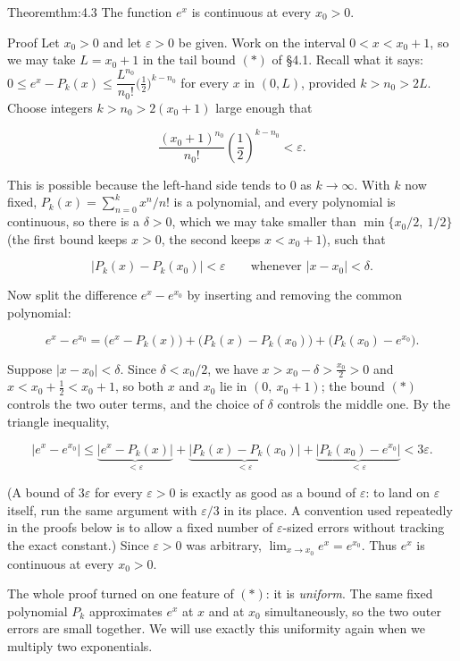\documentclass[a4paper,12pt,oneside]{memoir}
\begin{document}
\begin{envtheorem}{Theorem}{thm:4.3}{}
The function \(e^{x}\) is continuous at every \(x_{0} > 0\).
\end{envtheorem}
\begin{envproof}{Proof}{}{}
Let \(x_{0} > 0\) and let \(\varepsilon > 0\) be given. Work on the interval \(0 < x < x_{0} + 1\), so we may take \(L = x_{0} + 1\) in the tail bound \((*)\) of §4.1. Recall what it says: \(0 \le e^{x} - P_{k}(x) \le \dfrac{L^{n_{0}}}{n_{0}!}\bigl(\tfrac{1}{2}\bigr)^{k - n_{0}}\) for every \(x\) in \((0, L)\), provided \(k > n_{0} > 2L\). Choose integers \(k > n_{0} > 2(x_{0} + 1)\) large enough that

\[ \frac{(x_{0} + 1)^{n_{0}}}{n_{0}!} \left(\frac{1}{2}\right)^{k - n_{0}} < \varepsilon. \]

This is possible because the left-hand side tends to \(0\) as \(k \to \infty\). With \(k\) now fixed, \(P_{k}(x) = \sum_{n=0}^{k} x^{n}/n!\) is a polynomial, and every polynomial is continuous, so there is a \(\delta > 0\), which we may take smaller than \(\min\{x_{0}/2,\ 1/2\}\) (the first bound keeps \(x > 0\), the second keeps \(x < x_{0} + 1\)), such that

\[ \lvert P_{k}(x) - P_{k}(x_{0}) \rvert < \varepsilon \qquad \text{whenever } \lvert x - x_{0} \rvert < \delta. \]

Now split the difference \(e^{x} - e^{x_{0}}\) by inserting and removing the common polynomial:

\[ e^{x} - e^{x_{0}} = \bigl(e^{x} - P_{k}(x)\bigr) + \bigl(P_{k}(x) - P_{k}(x_{0})\bigr) + \bigl(P_{k}(x_{0}) - e^{x_{0}}\bigr). \]

Suppose \(\lvert x - x_{0} \rvert < \delta\). Since \(\delta < x_{0}/2\), we have \(x > x_{0} - \delta > \tfrac{x_{0}}{2} > 0\) and \(x < x_{0} + \tfrac{1}{2} < x_{0} + 1\), so both \(x\) and \(x_{0}\) lie in \((0,\ x_{0} + 1)\); the bound \((*)\) controls the two outer terms, and the choice of \(\delta\) controls the middle one. By the triangle inequality,

\[ \lvert e^{x} - e^{x_{0}} \rvert \le \underbrace{\lvert e^{x} - P_{k}(x) \rvert}_{< \varepsilon} + \underbrace{\lvert P_{k}(x) - P_{k}(x_{0}) \rvert}_{< \varepsilon} + \underbrace{\lvert P_{k}(x_{0}) - e^{x_{0}} \rvert}_{< \varepsilon} < 3\varepsilon. \]

(A bound of \(3\varepsilon\) for every \(\varepsilon > 0\) is exactly as good as a bound of \(\varepsilon\): to land on \(\varepsilon\) itself, run the same argument with \(\varepsilon/3\) in its place. A convention used repeatedly in the proofs below is to allow a fixed number of \(\varepsilon\)-sized errors without tracking the exact constant.) Since \(\varepsilon > 0\) was arbitrary, \(\lim_{x \to x_{0}} e^{x} = e^{x_{0}}\). Thus \(e^{x}\) is continuous at every \(x_{0} > 0\). \qedmark
\end{envproof}
The whole proof turned on one feature of \((*)\): it is \emph{uniform}. The same fixed polynomial \(P_{k}\) approximates \(e^{x}\) at \(x\) and at \(x_{0}\) simultaneously, so the two outer errors are small together. We will use exactly this uniformity again when we multiply two exponentials.
\end{document}
